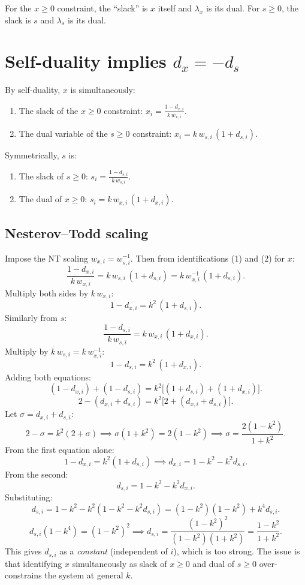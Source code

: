 \documentclass{article}
\begin{document}
For the $x \geq 0$ constraint, the ``slack'' is $x$ itself and $\lambda_x$ is its dual. For $s \geq 0$, the slack is $s$ and $\lambda_s$ is its dual.

\section{Self-duality implies $d_x = -d_s$}

By self-duality, $x$ is simultaneously:
\begin{enumerate}
  \item The slack of the $x \geq 0$ constraint: $x_i = \frac{1 - d_{x,i}}{k \, w_{x,i}}$.
  \item The dual variable of the $s \geq 0$ constraint: $x_i = k \, w_{s,i} \, (1 + d_{s,i})$.
\end{enumerate}
Symmetrically, $s$ is:
\begin{enumerate}
  \item The slack of $s \geq 0$: $s_i = \frac{1 - d_{s,i}}{k \, w_{s,i}}$.
  \item The dual of $x \geq 0$: $s_i = k \, w_{x,i} \, (1 + d_{x,i})$.
\end{enumerate}

\subsection{Nesterov--Todd scaling}

Impose the NT scaling $w_{x,i} = w_{s,i}^{-1}$. Then from identifications (1) and (2) for $x$:
\[
  \frac{1 - d_{x,i}}{k \, w_{x,i}} = k \, w_{s,i} \, (1 + d_{s,i}) = k \, w_{x,i}^{-1} \, (1 + d_{s,i}).
\]
Multiply both sides by $k \, w_{x,i}$:
\[
  1 - d_{x,i} = k^2 \, (1 + d_{s,i}).
\]
Similarly from $s$:
\[
  \frac{1 - d_{s,i}}{k \, w_{s,i}} = k \, w_{x,i} \, (1 + d_{x,i}).
\]
Multiply by $k \, w_{s,i} = k \, w_{x,i}^{-1}$:
\[
  1 - d_{s,i} = k^2 \, (1 + d_{x,i}).
\]
Adding both equations:
\[
  (1 - d_{x,i}) + (1 - d_{s,i}) = k^2 \bigl[(1 + d_{s,i}) + (1 + d_{x,i})\bigr].
\]
\[
  2 - (d_{x,i} + d_{s,i}) = k^2 \bigl[2 + (d_{x,i} + d_{s,i})\bigr].
\]
Let $\sigma = d_{x,i} + d_{s,i}$:
\[
  2 - \sigma = k^2(2 + \sigma) \implies \sigma(1 + k^2) = 2(1 - k^2) \implies \sigma = \frac{2(1-k^2)}{1+k^2}.
\]
From the first equation alone:
\[
  1 - d_{x,i} = k^2(1 + d_{s,i}) \implies d_{x,i} = 1 - k^2 - k^2 d_{s,i}.
\]
From the second:
\[
  d_{s,i} = 1 - k^2 - k^2 d_{x,i}.
\]
Substituting:
\[
  d_{s,i} = 1 - k^2 - k^2(1 - k^2 - k^2 d_{s,i}) = (1-k^2)(1 - k^2) + k^4 d_{s,i}.
\]
\[
  d_{s,i}(1 - k^4) = (1-k^2)^2 \implies d_{s,i} = \frac{(1-k^2)^2}{(1-k^2)(1+k^2)} = \frac{1 - k^2}{1 + k^2}.
\]
This gives $d_{s,i}$ as a \emph{constant} (independent of $i$), which is too strong. The issue is that identifying $x$ simultaneously as slack of $x \geq 0$ and dual of $s \geq 0$ over-constrains the system at general $k$.
\end{document}
